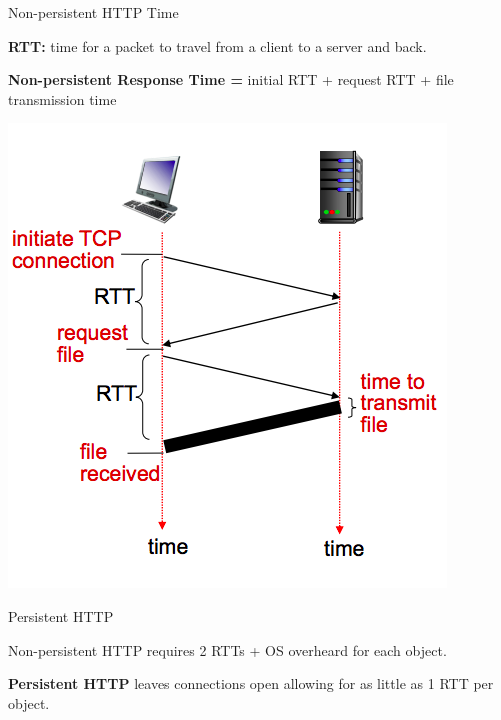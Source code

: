 \begin{topic}{Non-persistent HTTP Time}

\begin{multicols}{2}
\textbf{RTT:} time for a packet to travel from a client to a server and back.

\textbf{Non-persistent Response Time = } initial RTT + request RTT + file transmission time

\columnbreak
\includegraphics[scale=0.35]{coms3200/images/nonpersistent}
\end{multicols}

\end{topic}

\begin{topic}{Persistent HTTP}

Non-persistent HTTP requires 2 RTTs + OS overheard for each object.

\textbf{Persistent HTTP} leaves connections open allowing for as little as 1 RTT per object.

\end{topic}

